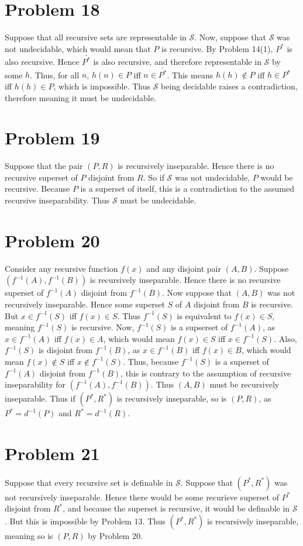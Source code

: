 \documentclass{article}
\theoremstyle{definition}
\begin{document}
\section*{Problem 18}
Suppose that all recursive sets are representable in $\mathcal{S}$. Now, suppose that $\mathcal{S}$ was not undecidable, which would mean that $P$ is recursive. By Problem 
14(1), $P^*$ is also recursive. Hence $\bar{P^*}$ is also recursive, and therefore representable in $\mathcal{S}$ by some $h$. Thus, for all $n$, $h(n)\in P$ iff $n\in\bar{P^*}$. 
This means $h(h)\notin P$ iff $h\in P^*$ iff $h(h)\in P$, which is impossible. Thus $\mathcal{S}$ being decidable raises a contradiction, therefore meaning it must be undecidable.

\section*{Problem 19}
Suppose that the pair $(P,R)$ is recursively inseparable. Hence there is no recursive superset of $P$ disjoint from $R$. So if $\mathcal{S}$ was not undecidable, $P$ would be recursive. Because 
$P$ is a superset of itself, this is a contradiction to the assumed recursive inseparability. Thus $\mathcal{S}$ must be undecidable.

\section*{Problem 20}
Consider any recursive function $f(x)$ and any disjoint pair $(A,B)$. Suppose $(f^{-1}(A),f^{-1}(B))$ is recursively inseparable. Hence there is no recursive superset of $f^{-1}(A)$ disjoint from 
$f^{-1}(B)$. Now suppose that $(A,B)$ was not recursively inseparable. Hence some superset $S$ of $A$ disjoint from $B$ is recursive. But $x\in f^{-1}(S)$ iff $f(x)\in S$. Thus 
$f^{-1}(S)$ is equivalent to $f(x)\in S$, meaning $f^{-1}(S)$ is recursive. Now, $f^{-1}(S)$ is a supserset of $f^{-1}(A)$, as $x\in f^{-1}(A)$ iff $f(x)\in A$, which would mean $f(x)\in S$ iff 
$x\in f^{-1}(S)$. Also, $f^{-1}(S)$ is disjoint from $f^{-1}(B)$, as $x\in f^{-1}(B)$ iff $f(x)\in B$, which would mean $f(x)\notin S$ iff $x\notin f^{-1}(S)$.
Thus, because $f^{-1}(S)$ is a superset of $f^{-1}(A)$ disjoint from $f^{-1}(B)$, this is contrary to the 
assumption of recursive inseparability for $(f^{-1}(A),f^{-1}(B))$. Thus $(A,B)$ must be recursively inseparable. Thus if $(P^*,R^*)$ is recursively inseparable, so is $(P,R)$, as 
$P^*=d^{-1}(P)$ and $R^*=d^{-1}(R)$.

\section*{Problem 21}
Suppose that every recursive set is definable in $\mathcal{S}$. Suppose that $(P^*,R^*)$ was not recursively inseparable. Hence there would be some recurisve 
superset of $P^*$ disjoint from $R^*$, and because the superset is recursive, it would be definable in $\mathcal{S}$. 
But this is impossible by Problem 13. Thus $(P^*,R^*)$ is recursively inseparable, meaning so is $(P,R)$ by Problem 20.
\end{document}
